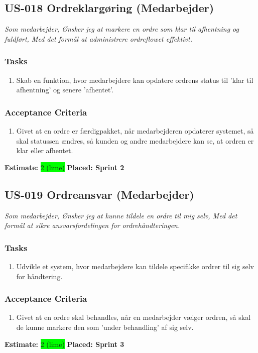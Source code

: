 \subsection{US-018 Ordreklargøring (Medarbejder)}
\label{sec:US-018}
\textit{Som medarbejder, Ønsker jeg at markere en ordre som klar til afhentning og fuldført, Med det formål at administrere ordreflowet effektivt.}
\subsubsection*{\textbf{Tasks}}
\begin{enumerate}
  \item Skab en funktion, hvor medarbejdere kan opdatere ordrens status til 'klar til afhentning' og senere 'afhentet'.
\end{enumerate}
\subsubsection*{\textbf{Acceptance Criteria}}
\begin{enumerate}
  \item Givet at en ordre er færdigpakket, når medarbejderen opdaterer systemet, så skal statussen ændres, så kunden og andre medarbejdere kan se, at ordren er klar eller afhentet.
\end{enumerate}
\textbf{Estimate:} \colorbox{lime}{2 (lime)}
\textbf{Placed: Sprint 2}
\par\noindent\dotfill

\subsection{US-019 Ordreansvar (Medarbejder)}
\label{sec:US-019}
\textit{Som medarbejder, Ønsker jeg at kunne tildele en ordre til mig selv, Med det formål at sikre ansvarsfordelingen for ordrehåndteringen.}
\subsubsection*{\textbf{Tasks}}
\begin{enumerate}
  \item Udvikle et system, hvor medarbejdere kan tildele specifikke ordrer til sig selv for håndtering.
\end{enumerate}
\subsubsection*{\textbf{Acceptance Criteria}}
\begin{enumerate}
  \item Givet at en ordre skal behandles, når en medarbejder vælger ordren, så skal de kunne markere den som 'under behandling' af sig selv.
\end{enumerate}
\textbf{Estimate:} \colorbox{lime}{2 (lime)}
\textbf{Placed: Sprint 3}
\par\noindent\dotfill

